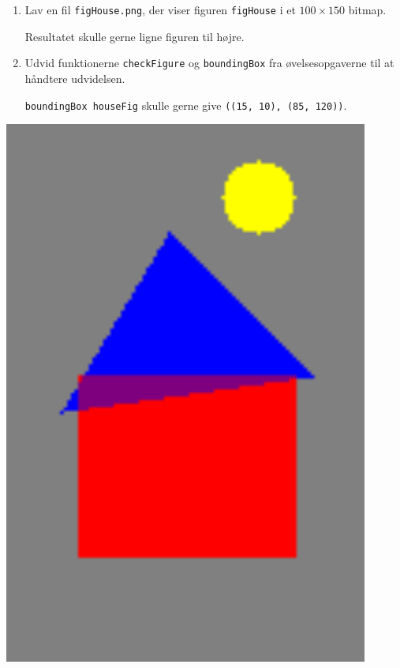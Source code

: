 \documentclass[a4paper,12pt]{article}
\begin{document}
\begin{minipage}{.72\textwidth}

\begin{enumerate}[label=8g.\arabic*,start=4]

\item Lav en fil \texttt{figHouse.png}, der viser figuren
  \texttt{figHouse} i et $100\times150$ bitmap.

  Resultatet skulle gerne ligne figuren til højre.

\item Udvid funktionerne \texttt{checkFigure} og
  \texttt{boundingBox} fra øvelsesopgaverne til at håndtere
  udvidelsen.

  \texttt{boundingBox houseFig} skulle gerne give \texttt{((15, 10), (85,
    120))}.
\end{enumerate}

\end{minipage} \hfill \begin{minipage}{.2\textwidth}
  \includegraphics[width=0.9\textwidth]{figHouse.png}
\end{minipage}
\end{document}
